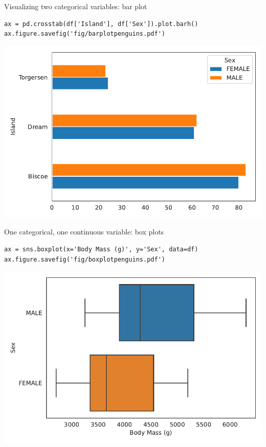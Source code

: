 \documentclass[aspectratio=169,usenames,dvipsnames]{beamer}
\begin{document}
\begin{frame}[fragile]{Visualizing two categorical variables: bar plot}
\begin{lstlisting}
ax = pd.crosstab(df['Island'], df['Sex']).plot.barh()
ax.figure.savefig('fig/barplotpenguins.pdf')
\end{lstlisting}

\includegraphics[height=0.7\textheight]{fig/barplotpenguins}
\end{frame}

\begin{frame}[fragile]{One categorical, one continuous variable: box plots}
\begin{lstlisting}
ax = sns.boxplot(x='Body Mass (g)', y='Sex', data=df)
ax.figure.savefig('fig/boxplotpenguins.pdf')
\end{lstlisting}
\includegraphics[height=0.7\textheight]{fig/boxplotpenguins}
\end{frame}
\end{document}
